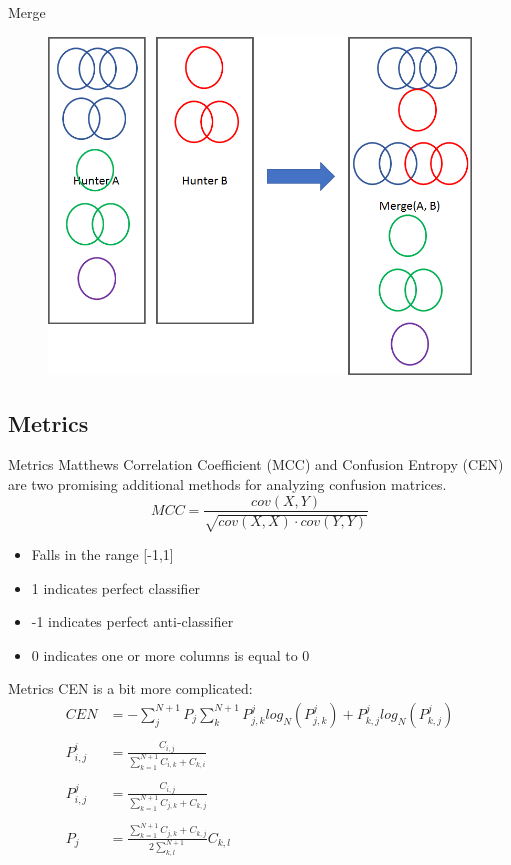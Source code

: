 \documentclass{beamer}
\begin{document}
\begin{frame}{Merge}
	
	\begin{figure}
		\centering
		\includegraphics[width=0.7\linewidth]{figures/png/HunterMerge}
		
		\label{fig:huntermerge}
	\end{figure}
\end{frame}


\subsection{Metrics}
\begin{frame}{Metrics}
	Matthews Correlation Coefficient (MCC) and Confusion Entropy (CEN) are two promising additional methods for analyzing confusion matrices.
	$$MCC = \frac{cov(X,Y)}{\sqrt{cov(X,X)\cdot cov(Y,Y)}}$$
	\begin{itemize}
		\item Falls in the range  [-1,1]
		\item 1 indicates perfect classifier
		\item -1 indicates perfect anti-classifier
		\item 0 indicates one or more columns is equal to 0
	\end{itemize}
	
\end{frame}

\begin{frame}{Metrics}
	CEN is a bit more complicated:\begin{align*}
		CEN &= - \sum_{j}^{N+1}P_j\sum_{k}^{N+1}P^j_{j,k}log_N(P^j_{j,k}) + P^j_{k,j}log_N(P^j_{k,j})\\
		\\
		P^i_{i,j}&=\frac{C_{i,j}}{\sum_{k=1}^{N+1}C_{i,k} + C_{k,i}}\\
		\\
		P^j_{i,j}&=\frac{C_{i,j}}{\sum_{k=1}^{N+1}C_{j,k} + C_{k,j}}\\
		\\
		P_j&= \frac{\sum_{k=1}^{N+1}C_{j,k}+ C_{k,j}}{2\sum_{k,l}^{N+1}}C_{k,l}
	\end{align*}
\end{frame}
\end{document}
